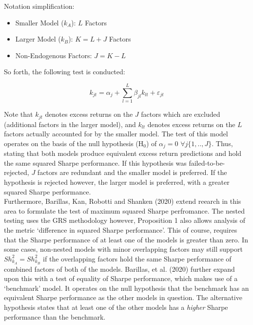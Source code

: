\documentclass[11pt, english]{article}
\begin{document}
	Notation simplification:

	\begin{itemize}
	\setlength\itemsep{0cm}
		\item Smaller Model ($k_{A}$): $L$ Factors
		\item Larger Model ($k_{B}$): $K=L+J$ Factors
		\item Non-Endogenous Factors: $J=K-L$
	\end{itemize}

	So forth, the following test is conducted:

	$$k_{jt}=\alpha_j+\sum_{l=1}^L\beta_{jl}k_{lt}+\varepsilon_{jt}$$

	Note that $k_{jt}$ denotes excess returns on the $J$ factors which are excluded (additional factors in the larger model), and $k_{lt}$ denotes excess returns on the $L$ factors actually accounted for by the smaller model. The test of this model operates on the basis of the null hypothesis (H$_0$) of $\alpha_j=0$ $\forall j\{1,..,J\}$. Thus, stating that both models produce equivalent excess return predictions and hold the same squared Sharpe performance. If this hypothesis was failed-to-be-rejected, $J$ factors are redundant and the smaller model is preferred. If the hypothesis is rejected however, the larger model is preferred, with a greater squared Sharpe performance.\\

	Furthermore, Barillas, Kan, Robotti and Shanken (2020) extend reearch in this area to formulate the test of maximum squared Sharpe perfromance. The nested testing uses the GRS methodology however, Proposition 1 also allows analysis of the metric `difference in squared Sharpe performance'. This of course, requires that the Sharpe performance of at least one of the models is greater than zero. In some cases, non-nested models with minor overlapping factors may still support $Sh_{k_{A}}^2=Sh_{k_{B}}^2$ if the overlapping factors hold the same Sharpe performance of combined factors of both of the models. Barillas, et al. (2020) further expand upon this with a test of equality of Sharpe performance, which makes use of a `benchmark' model. It operates on the null hypothesis that the benchmark has an equivalent Sharpe performance as the other models in question. The alternative hypothesis states that at least one of the other models has a \textit{higher} Sharpe performance than the benchmark.\\
\end{document}
